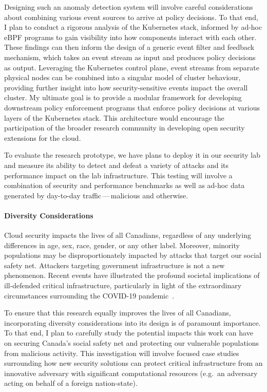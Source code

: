 Designing such an anomaly detection system will involve careful considerations about combining various event sources to arrive at policy decisions. To that end, I plan to conduct a rigorous analysis of the Kubernetes stack, informed by ad-hoc eBPF programs to gain visibility into how components interact with each other. These findings can then inform the design of a generic event filter and feedback mechanism, which takes an event stream as input and produces policy decisions as output. Leveraging the Kubernetes control plane, event streams from separate physical nodes can be combined into a singular model of cluster behaviour, providing further insight into how security-sensitive events impact the overall cluster. My ultimate goal is to provide a modular framework for developing downstream policy enforcement programs that enforce policy decisions at various layers of the Kubernetes stack. This architecture would encourage the participation of the broader research community in developing open security extensions for the cloud.

To evaluate the research prototype, we have plans to deploy it in our security lab and measure its ability to detect and defeat a variety of attacks and its performance impact on the lab infrastructure. This testing will involve a combination of security and performance benchmarks as well as ad-hoc data generated by day-to-day traffic\,---\,malicious and otherwise.

\paragraph*{Diversity Considerations}

Cloud security impacts the lives of all Canadians, regardless of any underlying differences in age, sex, race, gender, or any other label. Moreover, minority populations may be disproportionately impacted by attacks that target our social safety net. Attackers targeting government infrastructure is not a new phenomenon. Recent events have illustrated the profound societal implications of ill-defended critical infrastructure, particularly in light of the extraordinary circumstances surrounding the COVID-19 pandemic~\cite{reuters2021_pipeline, winder2020_covid}.

To ensure that this research equally improves the lives of all Canadians, incorporating diversity considerations into its design is of paramount importance. To that end, I plan to carefully study the potential impacts this work can have on securing Canada's social safety net and protecting our vulnerable populations from malicious activity. This investigation will involve focused case studies surrounding how new security solutions can protect critical infrastructure from an innovative adversary with significant computational resources (e.g.~an adversary acting on behalf of a foreign nation-state).

